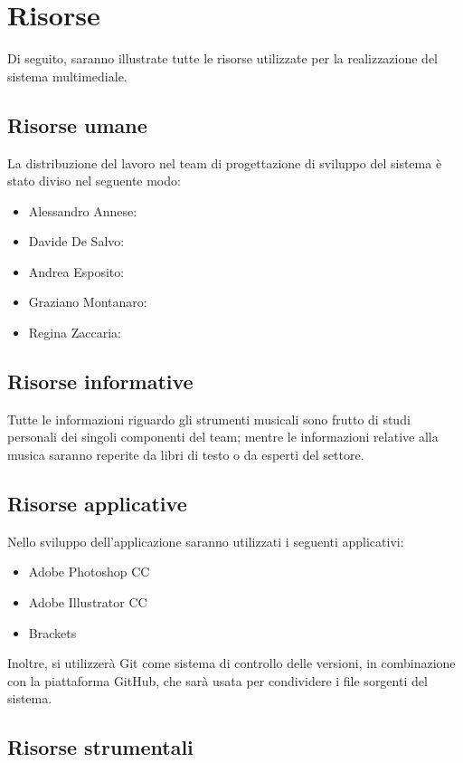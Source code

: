 \section{Risorse}
Di seguito, saranno illustrate tutte le risorse utilizzate per la realizzazione del sistema multimediale.
\subsection{Risorse umane}
La distribuzione del lavoro nel team di progettazione di sviluppo del sistema è stato diviso nel seguente modo:
\begin{itemize}
	\item Alessandro Annese: 
	\item Davide De Salvo:
	\item Andrea Esposito:
	\item Graziano Montanaro:
	\item Regina Zaccaria:
\end{itemize}

\subsection{Risorse informative}
Tutte le informazioni riguardo gli strumenti musicali sono frutto di studi personali dei singoli componenti del team; mentre le informazioni relative alla musica saranno reperite da libri di testo o da esperti del settore.

\subsection{Risorse applicative}
Nello sviluppo dell'applicazione saranno utilizzati i seguenti applicativi:
\begin{itemize}
	\item Adobe Photoshop CC
	\item Adobe Illustrator CC
	\item Brackets
\end{itemize}
Inoltre, si utilizzerà Git come sistema di controllo delle versioni, in combinazione con la piattaforma GitHub, che sarà usata per condividere i file sorgenti del sistema.

\subsection{Risorse strumentali}


